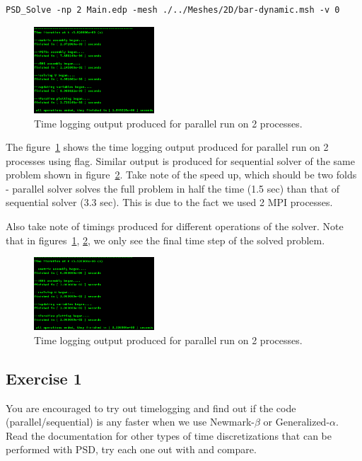 \begin{lstlisting}[style=BashInputStyle]
	PSD_Solve -np 2 Main.edp -mesh ./../Meshes/2D/bar-dynamic.msh -v 0
\end{lstlisting}


\begin{figure}[h!]
	\centering
	\includegraphics[width=0.4\textwidth]{./Images/ed-time-par.png}
	\caption{Time logging output produced for parallel run on 2 processes.\label{time-par-ed}}
\end{figure}

The figure~\ref{time-par-ed} shows the time logging output produced for parallel run on 2 processes using  flag. Similar output is produced for sequential solver of the same problem shown in figure~\ref{time-seq-ed}. Take note of the speed up, which should be two folds - parallel solver solves the full problem in half the time (1.5 sec) than that of sequential solver (3.3 sec). This is due to the fact we used 2 MPI processes.

Also take note of timings produced for different operations of the solver. Note that in figures~\ref{time-par-ed}, \ref{time-seq-ed}, we only see the final time step of the solved problem. 

\begin{figure}[h!]
	\centering
	\includegraphics[width=0.4\textwidth]{./Images/ed-time-seq.png}
	\caption{Time logging output produced for parallel run on 2 processes.\label{time-seq-ed}}
\end{figure}

\subsection{Exercise 1}

You are encouraged to try out timelogging and find out if the code (parallel/sequential) is any faster when we use Newmark-$\beta$ or Generalized-$\alpha$. Read the documentation for other types of time discretizations that can be performed with PSD, try each one out with  and compare. 


